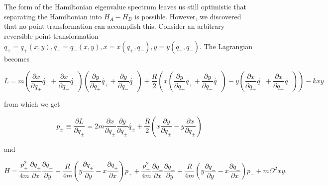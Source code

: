\newcommand{\qp}{\mbox{$q_{+}$}}
\newcommand{\qm}{\mbox{$q_{-}$}}
\newcommand{\uv}{\mbox{$q_{\pm}$}}
\newcommand{\vu}{\mbox{$q_{\mp}$}}
\newcommand{\xu}{\mbox{$\frac{\partial x}{\partial \qp}$}}
\newcommand{\xv}{\mbox{$\frac{\partial x}{\partial \qm}$}}
\newcommand{\xuv}{\mbox{$\frac{\partial x}{\partial \uv}$}}
\newcommand{\xvu}{\mbox{$\frac{\partial x}{\partial \vu}$}}
\newcommand{\ddx}{\mbox{$\frac{\partial^2 x}{\partial \qp \partial \qm}$}}
\newcommand{\ddy}{\mbox{$\frac{\partial^2 y}{\partial \qp \partial \qm}$}}
\newcommand{\yu}{\mbox{$\frac{\partial y}{\partial \qp}$}}
\newcommand{\yv}{\mbox{$\frac{\partial y}{\partial \qm}$}}
\newcommand{\yuv}{\mbox{$\frac{\partial y}{\partial \uv}$}}
\newcommand{\yvu}{\mbox{$\frac{\partial y}{\partial \vu}$}}
\newcommand{\ux}{\mbox{$\frac{\partial \qp}{\partial x}$}}
\newcommand{\uy}{\mbox{$\frac{\partial \qp}{\partial y}$}}
\newcommand{\vx}{\mbox{$\frac{\partial \qm}{\partial x}$}}
\newcommand{\vy}{\mbox{$\frac{\partial \qm}{\partial y}$}}
\newcommand{\uvx}{\mbox{$\frac{\partial \uv}{\partial x}$}}
\newcommand{\uvy}{\mbox{$\frac{\partial \uv}{\partial y}$}}
\newcommand{\ud}{\mbox{$\dot{\qp}$}}
\newcommand{\vd}{\mbox{$\dot{\qm}$}}
\newcommand{\uvd}{\mbox{$\dot{\uv}$}}
\newcommand{\pu}{\mbox{$p_{+}$}}
\newcommand{\pv}{\mbox{$p_{-}$}}
\newcommand{\puv}{\mbox{$p_{\pm}$}}

The form of the Hamiltonian eigenvalue spectrum leaves us still optimistic
that separating the Hamiltonian into $H_{A} - H_{B}$
is possible.  However, we discovered that
no point transformation can accomplish this.  Consider an arbitrary 
reversible point transformation $\qp = \qp(x, y), \qm = \qm(x, y),
x = x(\qp, \qm), y = y(\qp, \qm).$  The Lagrangian becomes

\begin{equation}
L = m (\xu \ud + \xv \vd)(\yu \ud + \yv \vd) + \frac{R}{2} (x (\yu \ud +
	\yv \vd) - y (\xu \ud + \xv \vd)) - k x y
\end{equation}

from which we get

\begin{equation}
\puv \equiv \frac{\partial L}{\partial \uv} = 2 m \xuv \yuv \uvd +
	\frac{R}{2} (x \yuv - y \xuv)
\end{equation}

and 

\begin{equation}
H = \frac{p^{2}_{+}}{4 m} \ux \uy + \frac{R}{4 m} (y \uy - x \ux) \pu
	+ \frac{p^{2}_{-}}{4 m} \vx \vy + \frac{R}{4 m} (y \vy - x \vx) \pv
	+ m \Omega^2 x y.
\end{equation}


